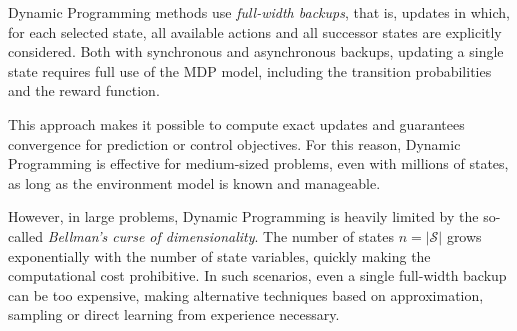 Dynamic Programming methods use \emph{full-width backups}, that is, updates in which, for each selected state, all available actions and all successor states are explicitly considered. Both with synchronous and asynchronous backups, updating a single state requires full use of the MDP model, including the transition probabilities and the reward function.

This approach makes it possible to compute exact updates and guarantees convergence for prediction or control objectives. For this reason, Dynamic Programming is effective for medium-sized problems, even with millions of states, as long as the environment model is known and manageable.

However, in large problems, Dynamic Programming is heavily limited by the so-called \emph{Bellman’s curse of dimensionality}. The number of states $n = |\mathcal{S}|$ grows exponentially with the number of state variables, quickly making the computational cost prohibitive. In such scenarios, even a single full-width backup can be too expensive, making alternative techniques based on approximation, sampling or direct learning from experience necessary.


